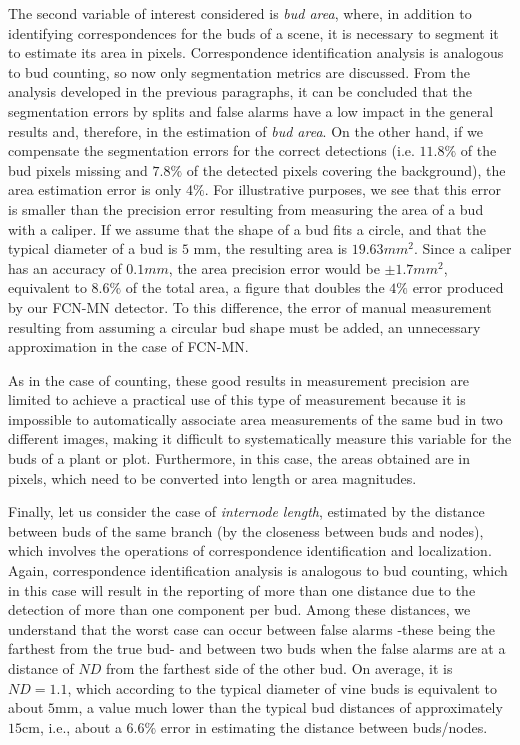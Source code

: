 \documentclass[a4paper,authoryear,review]{elsarticle}
\begin{document}
	The second variable of interest considered is \emph{bud area}, where, in addition to identifying correspondences for the buds of a scene, it is necessary to segment it to estimate its area in pixels. Correspondence identification analysis is analogous to bud counting, so now only segmentation metrics are discussed. From the analysis developed in the previous paragraphs, it can be concluded that the segmentation errors by splits and false alarms have a low impact in the general results and, therefore, in the estimation of \emph{bud area}. On the other hand, if we compensate the segmentation errors for the correct detections (i.e. $11.8\%$ of the bud pixels missing and $7.8\%$ of the detected pixels covering the background), the area estimation error is only $4\%$. For illustrative purposes, we see that this error is smaller than the precision error resulting from measuring the area of a bud with a caliper. If we assume that the shape of a bud fits a circle, and that the typical diameter of a bud is $5$ mm, the resulting area is $19.63 mm^2$. Since a caliper has an accuracy of $0.1 mm$, the area precision error would be $\pm 1.7 mm^2$, equivalent to $8.6\%$ of the total area, a figure that doubles the $4\%$ error produced by our FCN-MN detector. To this difference,  the error of manual measurement resulting from assuming a circular bud shape must be added, an unnecessary approximation in the case of FCN-MN.
	
	As in the case of counting, these good results in measurement precision are limited to achieve a practical use of this type of measurement because it is impossible to automatically associate area measurements of the same bud in two different images, making it difficult to systematically measure this variable for the buds of a plant or plot. Furthermore, in this case, the areas obtained are in pixels, which need to be converted into length or area magnitudes.
	
	Finally, let us consider the case of \emph{internode length}, estimated by the distance between buds of the same branch (by the closeness between buds and nodes), which involves the operations of correspondence identification and localization. Again, correspondence identification analysis is analogous to bud counting, which in this case will result in the reporting of more than one distance due to the detection of more than one component per bud. Among these distances, we understand that the worst case can occur between false alarms -these being the farthest from the true bud- and between two buds when the false alarms are at a distance of $ND$ from the farthest side of the other bud. On average, it is $ND = 1.1$, which according to the typical diameter of vine buds is equivalent to about $5$mm, a value much lower than the typical bud distances of approximately $15$cm, i.e., about a $6.6\%$ error in estimating the distance between buds/nodes. 
	
\end{document}
